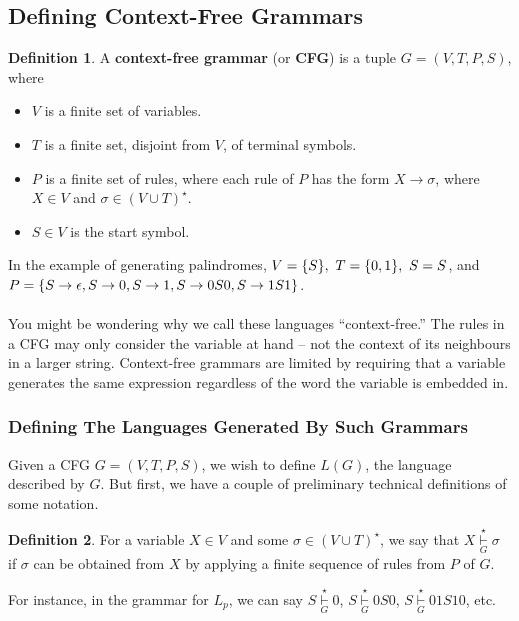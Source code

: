 \documentclass[]{article}
\DeclarePairedDelimiter{\set}{\lbrace}{\rbrace}
\theoremstyle{definition}
\newtheorem*{defn}{Definition}
\begin{document}
    \subsection{Defining Context-Free Grammars}
      \begin{defn}
        A \textbf{context-free grammar} (or \textbf{CFG}) is a tuple $G = (V, T, P, S)$, where
        \begin{itemize}
          \item $V$ is a finite set of variables.
          \item $T$ is a finite set, disjoint from $V$, of terminal symbols.
          \item $P$ is a finite set of rules, where each rule of $P$ has the form $X \to \sigma$, where $X \in V$ and $\sigma \in (V \cup T)^\star$.
          \item $S \in V$ is the start symbol.
        \end{itemize}
      \end{defn}

      In the example of generating palindromes, $V = \set{S},~ T = \set{0, 1},~ S = S$, and $P = \set{S \to \epsilon, S \to 0, S \to 1, S \to 0S0, S \to 1S1 }$.
      \\ \\
      You might be wondering why we call these languages ``context-free.'' The rules in a CFG may only consider the variable at hand -- not the context of its neighbours in a larger string. Context-free grammars are limited by requiring that a variable generates the same expression regardless of the word the variable is embedded in.

      \subsubsection{Defining The Languages Generated By Such Grammars}
        Given a CFG $G = (V, T, P, S)$, we wish to define $L(G)$, the language described by $G$. But first, we have a couple of preliminary technical definitions of some notation.

        \begin{defn}
          For a variable $X \in V$ and some $\sigma \in (V \cup T)^\star$, we say that $X \underset{G}{\overset{\star}{\vdash}} \sigma$ if $\sigma$ can be obtained from $X$ by applying a finite sequence of rules from $P$ of $G$.
        \end{defn}

        For instance, in the grammar for $L_p$, we can say $S \underset{G}{\overset{\star}{\vdash}} 0$, $S \underset{G}{\overset{\star}{\vdash}} 0S0$, $S \underset{G}{\overset{\star}{\vdash}} 01S10$, etc.
\end{document}
